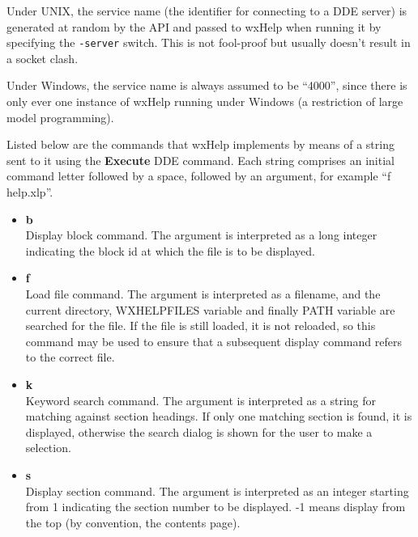 Under UNIX, the service name (the identifier for connecting to a DDE
server) is generated at random by the API and passed to wxHelp when
running it by specifying the {\tt -server} switch. This is not fool-proof
but usually doesn't result in a socket clash.

Under Windows, the service name is always assumed to be ``4000'',
since there is only ever one instance of wxHelp running under Windows
(a restriction of large model programming).

Listed below are the commands that wxHelp implements by means of a string
sent to it using the {\bf Execute} DDE command. Each string comprises an initial
command letter followed by a space, followed by an argument, for example
``f help.xlp''.

\begin{itemize}
\item {\bf b}\\
Display block command. The argument is interpreted as a long integer
indicating the block id at which the file is to be displayed.
\item {\bf f}\\
Load file command. The argument is interpreted as a filename, and the
current directory, WXHELPFILES variable and finally PATH variable are
searched for the file. If the file is still loaded, it is not
reloaded, so this command may be used to ensure that a subsequent
display command refers to the correct file.
\item {\bf k}\\
Keyword search command. The argument is interpreted as a string for matching
against section headings. If only one matching section is found, it is displayed,
otherwise the search dialog is shown for the user to make a selection.
\item {\bf s}\\
Display section command. The argument is interpreted as an integer
starting from 1 indicating the section number to be displayed. -1
means display from the top (by convention, the contents page).
\end{itemize}


